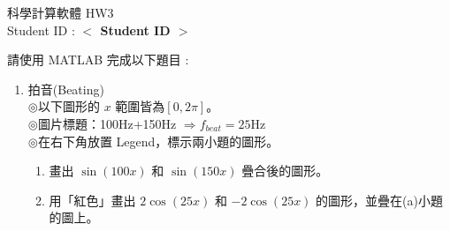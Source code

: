 \documentclass[12pt,a4paper]{article}
\newcommand{\placeholder}[1]{\textbf{$<$ #1 $>$}}
\newcommand{\idnumber}{\placeholder{Student ID}}
\begin{document}
\begin{CJK}{UTF8}{bsmi}
\begin{flushleft}科學計算軟體 HW3
\\Student ID : \idnumber{}\end{flushleft}

請使用 MATLAB 完成以下題目 : 
\begin{enumerate}
\item 拍音(Beating)\\
$\circledcirc$以下圖形的 $x$ 範圍皆為$[0,2\pi]$。\\
$\circledcirc$圖片標題：100Hz+150Hz $\Rightarrow f_{beat}=25$Hz\\
$\circledcirc$在右下角放置 Legend，標示兩小題的圖形。
\begin{enumerate} 
\item 畫出 $\sin(100x)$ 和 $\sin(150x)$ 疊合後的圖形。

\item 用「紅色」畫出 $2\cos(25x)$ 和 $-2\cos(25x)$ 的圖形，並疊在(a)小題的圖上。
\end{enumerate}
\end{enumerate}
\end{CJK}
\end{document}
